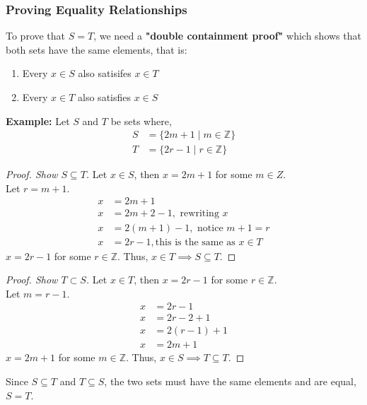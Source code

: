 \documentclass[12pt]{article}
\newcommand{\Z}{\mathbb{Z}}
\theoremstyle{definition}
\begin{document}
            \subsubsection{Proving Equality Relationships}
            To prove that $S=T$, we need a \textbf{"double containment proof"} which shows that both sets have the same
            elements, that is:
            \begin{enumerate}
                \item Every $x \in S$ also satisifes $x \in T$
                \item Every $x \in T$ also satisfies $x \in S$
            \end{enumerate}
            \textbf{Example:} Let $S$ and $T$ be sets where,
            \begin{align*}
                S &= \{2m+1 \mid m \in \Z\} \\
                T &= \{2r-1 \mid r \in \Z\}
            \end{align*}
            \begin{proof}[Proof. Show $S \subseteq T$]
                Let $x \in S$, then $x = 2m+1$ for some $m \in Z$. \\
                Let $r = m+1$.
                \begin{align*}
                    x &= 2m + 1 \\
                    x &= 2m + 2 - 1, \text{ rewriting $x$} \\
                    x &= 2(m + 1) - 1, \text{ notice $m+1 = r$} \\
                    x &= 2r - 1, \text{this is the same as $x \in T$}
                \end{align*}
                $x = 2r -1$ for some $r \in \Z$. Thus, $x \in T \implies S \subseteq T$.
            \end{proof}

            \begin{proof}[Proof. Show $T \subset S$]
                Let $x \in T$, then $x = 2r-1$ for some $r \in \Z$. \\
                Let $m = r - 1$.
                \begin{align*}
                    x &= 2r-1 \\
                    x &= 2r - 2 + 1 \\
                    x &= 2(r-1) + 1 \\
                    x &= 2m + 1
                \end{align*}
                $x = 2m + 1$ for some $m \in \Z$. Thus, $x \in S \implies T \subseteq T$.
            \end{proof}
            Since $S \subseteq T$ and $T \subseteq S$, the two sets must have the same elements and are equal, $S = T$.
\end{document}
